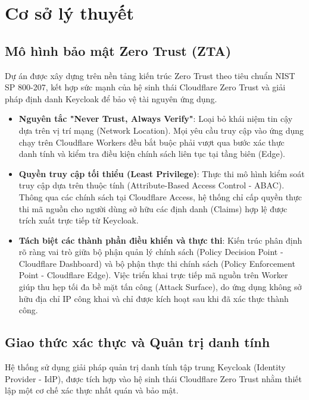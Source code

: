 \section{Cơ sở lý thuyết}
\subsection{Mô hình bảo mật Zero Trust (ZTA)}
Dự án được xây dựng trên nền tảng kiến trúc Zero Trust theo tiêu chuẩn NIST SP 800-207, kết hợp sức mạnh của hệ sinh thái Cloudflare Zero Trust và giải pháp định danh Keycloak để bảo vệ tài nguyên ứng dụng.

\begin{itemize}
\item \textbf{Nguyên tắc "Never Trust, Always Verify"}: Loại bỏ khái niệm tin cậy dựa trên vị trí mạng (Network Location). Mọi yêu cầu truy cập vào ứng dụng chạy trên Cloudflare Workers đều bắt buộc phải vượt qua bước xác thực danh tính và kiểm tra điều kiện chính sách liên tục tại tầng biên (Edge).

\item \textbf{Quyền truy cập tối thiểu (Least Privilege)}: Thực thi mô hình kiểm soát truy cập dựa trên thuộc tính (Attribute-Based Access Control - ABAC). Thông qua các chính sách tại Cloudflare Access, hệ thống chỉ cấp quyền thực thi mã nguồn cho người dùng sở hữu các định danh (Claims) hợp lệ được trích xuất trực tiếp từ Keycloak.

\item \textbf{Tách biệt các thành phần điều khiển và thực thi}: Kiến trúc phân định rõ ràng vai trò giữa bộ phận quản lý chính sách (Policy Decision Point - Cloudflare Dashboard) và bộ phận thực thi chính sách (Policy Enforcement Point - Cloudflare Edge). Việc triển khai trực tiếp mã nguồn trên Worker giúp thu hẹp tối đa bề mặt tấn công (Attack Surface), do ứng dụng không sở hữu địa chỉ IP công khai và chỉ được kích hoạt sau khi đã xác thực thành công.
\end{itemize}

\subsection{Giao thức xác thực và Quản trị danh tính}
Hệ thống sử dụng giải pháp quản trị danh tính tập trung Keycloak (Identity Provider - IdP), được tích hợp vào hệ sinh thái Cloudflare Zero Trust nhằm thiết lập một cơ chế xác thực nhất quán và bảo mật.

